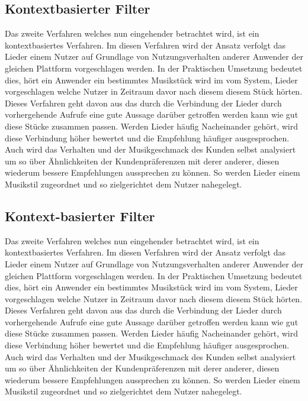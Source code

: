 \documentclass[twosided,a4,10pt]{article}
\begin{document}
\begin{multicols}{2}
\subsection{Kontextbasierter Filter}
Das zweite Verfahren welches nun eingehender betrachtet wird, ist ein kontextbasiertes Verfahren. Im diesen Verfahren wird der Ansatz verfolgt das Lieder einem Nutzer auf Grundlage von Nutzungsverhalten anderer Anwender der gleichen Plattform vorgeschlagen werden. In der Praktischen Umsetzung bedeutet dies, hört ein Anwender ein bestimmtes Musikstück wird im vom System, Lieder vorgeschlagen welche Nutzer in Zeitraum davor nach diesem diesem Stück hörten. Dieses Verfahren geht davon aus das durch die Verbindung der Lieder durch vorhergehende Aufrufe eine gute Aussage darüber getroffen werden kann wie gut diese Stücke zusammen passen. Werden Lieder häufig Nacheinander gehört, wird diese Verbindung höher bewertet und die Empfehlung häufiger ausgesprochen. Auch wird das Verhalten und der Musikgeschmack des Kunden selbst analysiert um so über Ähnlichkeiten der Kundenpräferenzen mit derer anderer, diesen wiederum bessere Empfehlungen aussprechen zu können. So werden Lieder einem Musikstil zugeordnet und so zielgerichtet dem Nutzer nahegelegt.

\subsection{Kontext-basierter Filter}
Das zweite Verfahren welches nun eingehender betrachtet wird, ist ein kontextbasiertes Verfahren. Im diesen Verfahren wird der Ansatz verfolgt das Lieder einem Nutzer auf Grundlage von Nutzungsverhalten anderer Anwender der gleichen Plattform vorgeschlagen werden. In der Praktischen Umsetzung bedeutet dies, hört ein Anwender ein bestimmtes Musikstück wird im vom System, Lieder vorgeschlagen welche Nutzer in Zeitraum davor nach diesem diesem Stück hörten. Dieses Verfahren geht davon aus das durch die Verbindung der Lieder durch vorhergehende Aufrufe eine gute Aussage darüber getroffen werden kann wie gut diese Stücke zusammen passen. Werden Lieder häufig Nacheinander gehört, wird diese Verbindung höher bewertet und die Empfehlung häufiger ausgesprochen. Auch wird das Verhalten und der Musikgeschmack des Kunden selbst analysiert um so über Ähnlichkeiten der Kundenpräferenzen mit derer anderer, diesen wiederum bessere Empfehlungen aussprechen zu können. So werden Lieder einem Musikstil zugeordnet und so zielgerichtet dem Nutzer nahegelegt.


\end{multicols}
\end{document}
